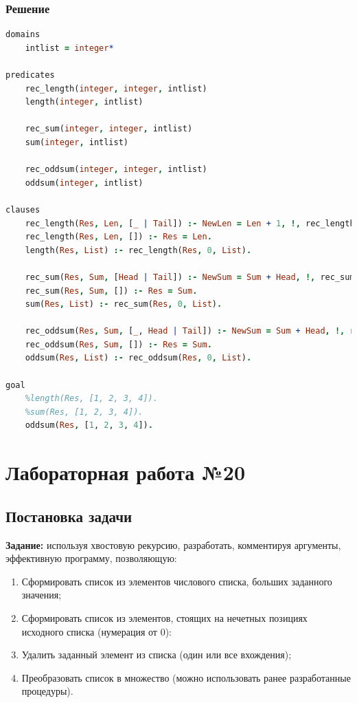 \documentclass[12pt]{report}
\begin{document}
\subsection*{Решение}
\begin{lstlisting}[language=prolog]
domains
	intlist = integer*

predicates
	rec_length(integer, integer, intlist)
	length(integer, intlist)

	rec_sum(integer, integer, intlist)
	sum(integer, intlist)

	rec_oddsum(integer, integer, intlist)
	oddsum(integer, intlist)

clauses
	rec_length(Res, Len, [_ | Tail]) :- NewLen = Len + 1, !, rec_length(Res, NewLen, Tail).
	rec_length(Res, Len, []) :- Res = Len.
	length(Res, List) :- rec_length(Res, 0, List).

	rec_sum(Res, Sum, [Head | Tail]) :- NewSum = Sum + Head, !, rec_sum(Res, NewSum, Tail).
	rec_sum(Res, Sum, []) :- Res = Sum.
	sum(Res, List) :- rec_sum(Res, 0, List).

	rec_oddsum(Res, Sum, [_, Head | Tail]) :- NewSum = Sum + Head, !, rec_oddsum(Res, NewSum, Tail).
	rec_oddsum(Res, Sum, []) :- Res = Sum.
	oddsum(Res, List) :- rec_oddsum(Res, 0, List).

goal
	%length(Res, [1, 2, 3, 4]).
	%sum(Res, [1, 2, 3, 4]).
	oddsum(Res, [1, 2, 3, 4]).
\end{lstlisting}

\chapter*{Лабораторная работа №20}
\section*{Постановка задачи}

\textbf{Задание:} используя хвостовую рекурсию, разработать, комментируя аргументы, эффективную программу, позволяющую:
\begin{enumerate}
	\item Сформировать список из элементов числового списка, больших заданного значения;
	\item Сформировать список из элементов, стоящих на нечетных позициях исходного списка (нумерация от 0):
	\item Удалить заданный элемент из списка (один или все вхождения);
	\item Преобразовать список в множество (можно использовать ранее разработанные процедуры).
\end{enumerate}
\end{document}
